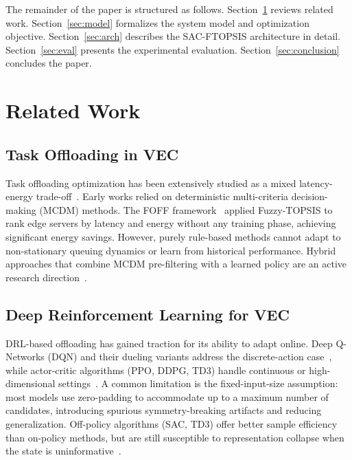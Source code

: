 \documentclass[iicol]{sn-jnl}
\begin{document}
The remainder of the paper is structured as follows.
Section~\ref{sec:related} reviews related work.
Section~\ref{sec:model} formalizes the system model and optimization objective.
Section~\ref{sec:arch} describes the SAC-FTOPSIS architecture in detail.
Section~\ref{sec:eval} presents the experimental evaluation.
Section~\ref{sec:conclusion} concludes the paper.

\section{Related Work}
\label{sec:related}

\subsection{Task Offloading in VEC}

Task offloading optimization has been extensively studied as a mixed latency-
energy trade-off~\cite{liu2022multitask_mec,fang2021mec_iot}.
Early works relied on deterministic multi-criteria decision-making (MCDM)
methods.
The FOFF framework~\cite{vieira2025foff} applied Fuzzy-TOPSIS to rank edge
servers by latency and energy without any training phase, achieving significant
energy savings.
However, purely rule-based methods cannot adapt to non-stationary queuing
dynamics or learn from historical performance.
Hybrid approaches that combine MCDM pre-filtering with a learned policy are an
active research direction~\cite{uddin2024intelligent}.

\subsection{Deep Reinforcement Learning for VEC}

DRL-based offloading has gained traction for its ability to adapt online.
Deep Q-Networks (DQN) and their dueling variants address the discrete-action
case~\cite{3459991.pdf}, while actor-critic algorithms (PPO, DDPG, TD3)
handle continuous or high-dimensional settings~\cite{schulman2017ppo}.
A common limitation is the fixed-input-size assumption: most models use
zero-padding to accommodate up to a maximum number of candidates, introducing
spurious symmetry-breaking artifacts and reducing generalization.
Off-policy algorithms (SAC, TD3) offer better sample efficiency than on-policy
methods, but are still susceptible to representation collapse when the state is
uninformative~\cite{haarnoja2018sac}.
\end{document}
